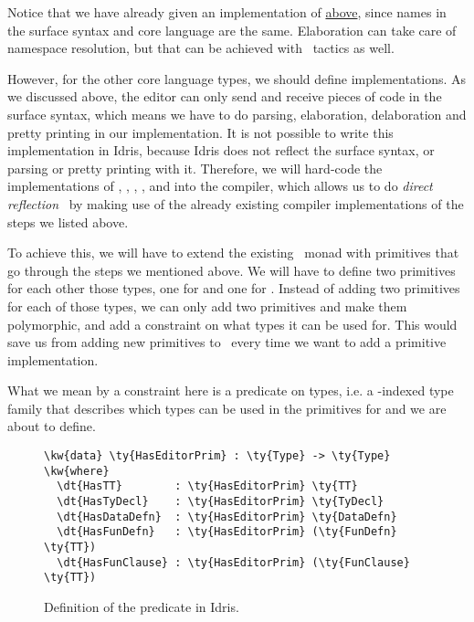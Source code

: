 Notice that we have already given an  implementation of
 \hyperref[code:ttnameEditorable]{above}, since names in the
surface syntax and core language are the same. Elaboration can take care of
namespace resolution, but that can be achieved with \Elab\ tactics as well.

However, for the other core language types, we should define 
implementations. As we discussed above, the editor can only send and receive
pieces of code in the surface syntax, which means we have to do parsing,
elaboration, delaboration and pretty printing in our 
implementation.
It is not possible to write this implementation in Idris,
because Idris does not reflect the surface syntax, or parsing or pretty
printing with it.
Therefore, we will hard-code the implementations of , ,
, , and  into the compiler,
which allows us to do \emph{direct reflection}~\cite{barzilayphd} by making use
of the already existing compiler implementations of the steps we listed above.

To achieve this, we will have to extend the existing \Elab\ monad with
primitives that go through the steps we mentioned above. We will have to define
two primitives for each other those types, one for  and one for
. Instead of adding two primitives for each of those types, we can
only add two primitives and make them polymorphic, and add a constraint on what
types it can be used for. This would save us from adding new primitives to
\Elab\ every time we want to add a primitive  implementation.

What we mean by a constraint here is a predicate on types,
i.e. a -indexed type family that describes which types can be used in
the primitives for  and  we are about to define.

\begin{figure}[H]
\caption{Definition of the  predicate in Idris.}
\begin{Verbatim}[framesep=2mm, label=\footnotesize{\normalfont{Idris}}, labelposition=topline]
\kw{data} \ty{HasEditorPrim} : \ty{Type} -> \ty{Type} \kw{where}
  \dt{HasTT}        : \ty{HasEditorPrim} \ty{TT}
  \dt{HasTyDecl}    : \ty{HasEditorPrim} \ty{TyDecl}
  \dt{HasDataDefn}  : \ty{HasEditorPrim} \ty{DataDefn}
  \dt{HasFunDefn}   : \ty{HasEditorPrim} (\ty{FunDefn} \ty{TT})
  \dt{HasFunClause} : \ty{HasEditorPrim} (\ty{FunClause} \ty{TT})
\end{Verbatim}
\end{figure}

